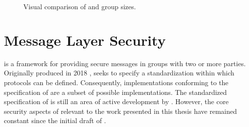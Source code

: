 \begin{figure}[ht!]
  \centering
  \caption[Secure Messaging and Secure Group Messaging]{%
  \label{fig:Secure-Messaging-And-Secure-Group-Messaging}%
  Visual comparison of  and  group sizes.
  }%
%
\end{figure}


\hypertarget{sec:message-layer-security}{%
\section{Message Layer Security}\label{sec:message-layer-security}}

 \autocite{Omara2020} is a framework for providing secure messages in groups with two or more parties.
Originally produced in 2018 \autocite{ietf-mls-architecture-02},  seeks to specify a standardization within which  protocols can be defined.
Consequently, implementations conforming to the specification of  are a subset of possible  implementations.
The standardized specification of  is still an area of active development by .
However, the core security aspects of  relevant to the work presented in this thesis have remained constant since the initial draft of .

